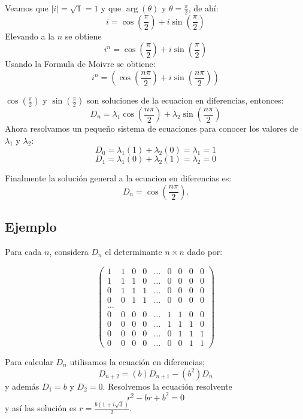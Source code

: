 \documentclass{report}
\begin{document}
Veamos que  $|i|=\sqrt{1}=1$ y que $\arg(\theta)$ y $\theta= \frac{\pi}{2}$, de ahí:
$$i=\cos(\frac{\pi}{2})+i\sin(\frac{\pi}{2})$$
Elevando a la $n$ se obtiene
$$i^n=\cos(\frac{\pi}{2})+i\sin(\frac{\pi}{2})$$
Usando la Formula de Moivre se obtiene:
$$i^n=(\cos(\frac{n\pi}{2})+i\sin(\frac{n\pi}{2}))$$

$\cos(\frac{\pi}{2})$ y  $\sin(\frac{\pi}{2})$ son soluciones de la ecuacion en diferencias, entonces: 
$$D_{n}=\lambda_{1}\cos(\frac{n\pi}{2})+\lambda_{2}\sin(\frac{n\pi}{2})$$
Ahora resolvamos un pequeño sistema de ecuaciones para conocer los valores de $\lambda_1$ y $\lambda_2$:
  $$D_{0}=\lambda_{1}(1)+\lambda_{2}(0)=\lambda_{1}=1$$
  $$D_{1}=\lambda_{1}(0)+\lambda_{2}(1)=\lambda_{2}=0$$

Finalmente la solución general a la ecuacion en diferencias es:
\begin{equation}
  \label{solucion determinante}
D_{n}=\cos(\frac{n\pi}{2}).
\end{equation}


\subsection{Ejemplo}

Para cada $n$, considera $D_{n}$ el determinante $n\times n$ dado por:

\begin{equation*}
\begin{pmatrix}
1 & 1 & 0 & 0 &\ldots & 0 & 0 & 0 & 0\\
1 & 1 & 1 & 0 &\ldots & 0 & 0 & 0 & 0\\
0 & 1 & 1 & 1 &\ldots & 0 & 0 & 0 & 0\\
0 & 0 & 1 & 1 &\ldots & 0 & 0 & 0 & 0\\
\ldots\\
0 & 0 & 0 & 0 &\ldots & 1 & 1 & 0 & 0\\
0 & 0 & 0 & 0 &\ldots & 1 & 1 & 1 & 0\\
0 & 0 & 0 & 0 &\ldots & 0 & 1 & 1 & 1\\
0 & 0 & 0 & 0 &\ldots & 0 & 0 & 1 & 1
\end{pmatrix}
\end{equation*}


Para calcular $D_{n}$ utilisamos la ecuación en diferencias;
\begin{equation}
  \label{determinante}
D_{n+2}=(b)D_{n+1}-(b^2)D_{n}
\end{equation}
 y además $D_{1}=b$ y $D_{2}=0$.
Resolvemos la ecuación resolvente $$r^{2}-br+b^2=0$$ y así las solución es $r=\frac{b(1+i \sqrt{3})}{2}$.
\end{document}
